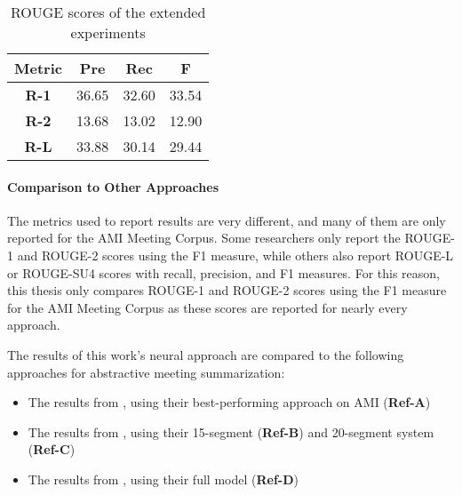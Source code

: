 \begin{table}[h]
\centering
\begin{tabular}{@{}clll@{}}
\toprule
\textbf{Metric} & \multicolumn{1}{c}{\textbf{Pre}} & \multicolumn{1}{c}{\textbf{Rec}} & \multicolumn{1}{c}{\textbf{F}} \\ \midrule
\textbf{R-1}    & 36.65                           & 32.60                           & 33.54                         \\
\textbf{R-2}    & 13.68                           & 13.02                           & 12.90                         \\
\textbf{R-L}    & 33.88                           & 30.14                           & 29.44                         \\ \bottomrule
\end{tabular}
\caption{ROUGE scores of the extended experiments}
\label{tab:extended-experiment-rouge}
\end{table}

\paragraph{Comparison to Other Approaches}

The metrics used to report results are very different, and many of them are only reported for the AMI Meeting Corpus.
Some researchers only report the ROUGE-1 and ROUGE-2 scores using the F1 measure, while others also report ROUGE-L or ROUGE-SU4 scores with recall, precision, and F1 measures.
For this reason, this thesis only compares ROUGE-1 and ROUGE-2 scores using the F1 measure for the AMI Meeting Corpus as these scores are reported for nearly every approach.

The results of this work's neural approach are compared to the following approaches for abstractive meeting summarization:
\begin{itemize}
\item The results from \cite{shang-etal-2018-unsupervised}, using their best-performing approach on AMI (\textbf{Ref-A})
\item The results from \cite{oya-etal-2014-template}, using their 15-segment (\textbf{Ref-B}) and 20-segment system (\textbf{Ref-C})
\item The results from \cite{mehdad-etal-2013-abstractive}, using their full model (\textbf{Ref-D})
\end{itemize}

